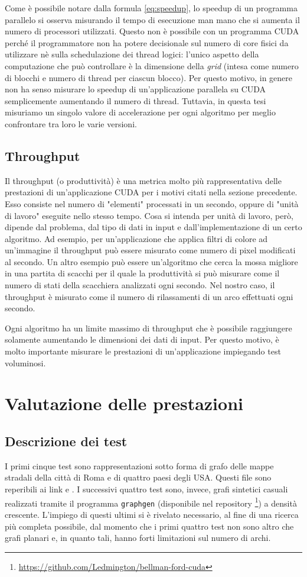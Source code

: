 \documentclass[12pt,a4paper,oneside]{book}
\begin{document}
	Come è possibile notare dalla formula \ref{eq:speedup}, lo speedup di un programma parallelo si osserva misurando il tempo di esecuzione man mano che si aumenta il numero di processori utilizzati. Questo non è possibile con un programma CUDA perché il programmatore non ha potere decisionale sul numero di core fisici da utilizzare nè sulla schedulazione dei thread logici: l'unico aspetto della computazione che può controllare è la dimensione della \textit{grid} (intesa come numero di blocchi e numero di thread per ciascun blocco). Per questo motivo, in genere non ha senso misurare lo speedup di un'applicazione parallela su CUDA semplicemente aumentando il numero di thread. Tuttavia, in questa tesi misuriamo un singolo valore di accelerazione per ogni algoritmo per meglio confrontare tra loro le varie versioni.
	
	\section{Throughput}
	Il throughput (o produttività) è una metrica molto più rappresentativa delle prestazioni di un'applicazione CUDA per i motivi citati nella sezione precedente. Esso consiste nel numero di "elementi" processati in un secondo, oppure di "unità di lavoro" eseguite nello stesso tempo. Cosa si intenda per unità di lavoro, però, dipende dal problema, dal tipo di dati in input e dall'implementazione di un certo algoritmo. Ad esempio, per un'applicazione che applica filtri di colore ad un'immagine il throughput può essere misurato come numero di pixel modificati al secondo. Un altro esempio può essere un'algoritmo che cerca la mossa migliore in una partita di scacchi per il quale la produttività si può misurare come il numero di stati della scacchiera analizzati ogni secondo. Nel nostro caso, il throughput è misurato come il numero di rilassamenti di un arco effettuati ogni secondo.
	
	Ogni algoritmo ha un limite massimo di throughput che è possibile raggiungere solamente aumentando le dimensioni dei dati di input. Per questo motivo, è molto importante misurare le prestazioni di un'applicazione impiegando test voluminosi.
	
	\chapter{Valutazione delle prestazioni}
	\label{chap:perf}
	\section{Descrizione dei test}
	I primi cinque test sono rappresentazioni sotto forma di grafo delle mappe stradali della città di Roma e di quattro paesi degli USA. Questi file sono reperibili ai link \cite{testUSA} e \cite{testRoma}. I successivi quattro test sono, invece, grafi sintetici casuali realizzati tramite il programma \texttt{graphgen} (disponibile nel repository \footnote{\url{https://github.com/Ledmington/bellman-ford-cuda}}) a densità crescente. L'impiego di questi ultimi si è rivelato necessario, al fine di una ricerca più completa possibile, dal momento che i primi quattro test non sono altro che grafi planari e, in quanto tali, hanno forti limitazioni sul numero di archi.
	
\end{document}
